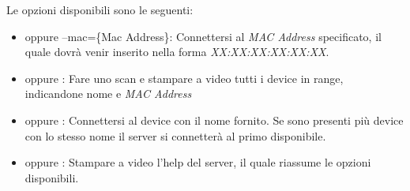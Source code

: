 Le opzioni disponibili sono le seguenti:
\begin{itemize}
    \item {} oppure {--mac=\{Mac Address\}}:
        Connettersi al \emph{MAC Address} specificato, il quale dovrà venir
        inserito nella forma \emph{XX:XX:XX:XX:XX:XX}.
    \item {} oppure : Fare uno scan
         e stampare a video tutti i device in range,
        indicandone nome e \emph{MAC Address}
    \item {} oppure
        : Connettersi al device
         con il nome fornito. Se sono presenti più
        device con lo stesso nome il server si connetterà al primo
        disponibile.
    \item {} oppure : Stampare a video l'help del
        server, il quale riassume le opzioni disponibili.
\end{itemize}


\cleardoublepage
